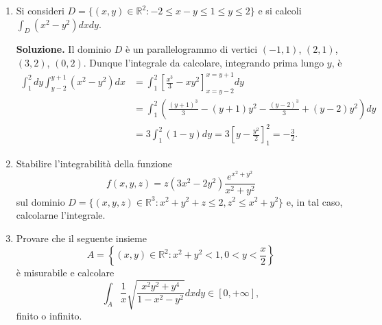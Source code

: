 \begin{enumerate}
	\item Si consideri $D = \{(x,y) \in \mathbb{R}^2 : -2 \leq x - y \leq 1 \leq y \leq 2\}$ e si calcoli $\int_D (x^2 - y^2) dx dy$.
	
	\textbf{Soluzione.}
		Il dominio $D$ è un parallelogrammo di vertici $(-1,1)$, $(2,1)$, $(3,2)$, $(0,2)$. Dunque l'integrale da calcolare, integrando prima lungo $y$, è
		\[
		\begin{aligned}
			\int_1^2 dy \int_{y-2}^{y+1} (x^2 - y^2) dx &= \int_1^2 \left[\frac{x^3}{3} - x y^2\right]_{x = y - 2}^{x = y + 1} dy \\
			&= \int_1^2 \left(\frac{(y+1)^3}{3} - (y+1)y^2 - \frac{(y-2)^3}{3} + (y-2)y^2\right) dy \\
			&= 3 \int_1^2 (1 - y) dy = 3 \left[y - \frac{y^2}{2}\right]_1^2 = -\frac{3}{2}.
		\end{aligned}
		\]
	
	
	\item Stabilire l'integrabilità della funzione
	\[
	f(x,y,z) = z(3x^2 - 2y^2) \frac{e^{x^2 + y^2}}{x^2 + y^2}
	\]
	sul dominio $D = \{(x,y,z) \in \mathbb{R}^3 : x^2 + y^2 + z \leq 2, z^2 \leq x^2 + y^2\}$ e, in tal caso, calcolarne l'integrale.
	
	\item Provare che il seguente insieme
	\[
	A = \left\{(x,y) \in \mathbb{R}^2 : x^2 + y^2 < 1, 0 < y < \frac{x}{2}\right\}
	\]
	è misurabile e calcolare
	\[
	\int_A \frac{1}{x} \sqrt{\frac{x^2 y^2 + y^4}{1 - x^2 - y^2}} dx dy \in [0, +\infty],
	\]
	finito o infinito.
	

\end{enumerate}
